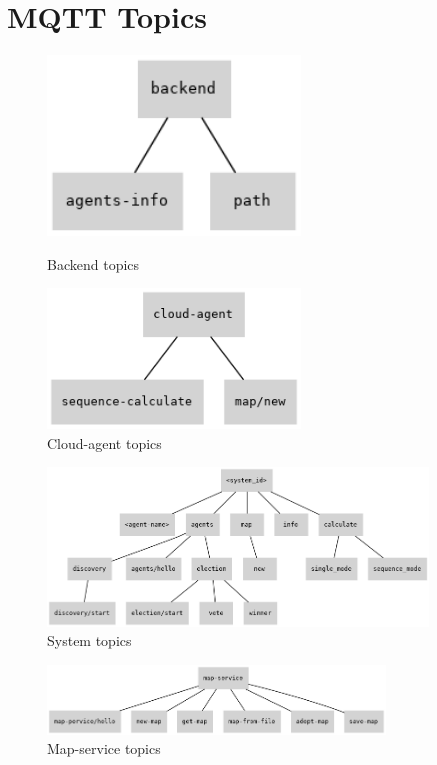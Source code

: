 \chapter{MQTT Topics}
\label{sec:app_02}

\begin{figure}[H]
\centering
\begin{minipage}{0.5\textwidth}
    \centering
    \includegraphics[width=0.6\textwidth]{pictures/topic_backend.png}
    \caption{ Backend topics }
    \label{fig:topics_backend}
\end{minipage}%
\begin{minipage}{0.5\textwidth}
    \centering
    \includegraphics[width=0.6\textwidth]{pictures/topic_cloud-agent.png}
    \caption{ Cloud-agent topics }
    \label{fig:topics_cloud_agent}
\end{minipage}
\end{figure}


\begin{figure}[H]
    \centering
    \includegraphics[width=0.9\textwidth]{pictures/topic_system_id.png}
    \caption{ System topics }
    \label{fig:topics_system_id}
\end{figure}

\begin{figure}[H]
    \centering
    \includegraphics[width=0.8\textwidth]{pictures/topic_map-service.png}
    \caption{ Map-service topics }
    \label{fig:topics_map_service}
\end{figure}
